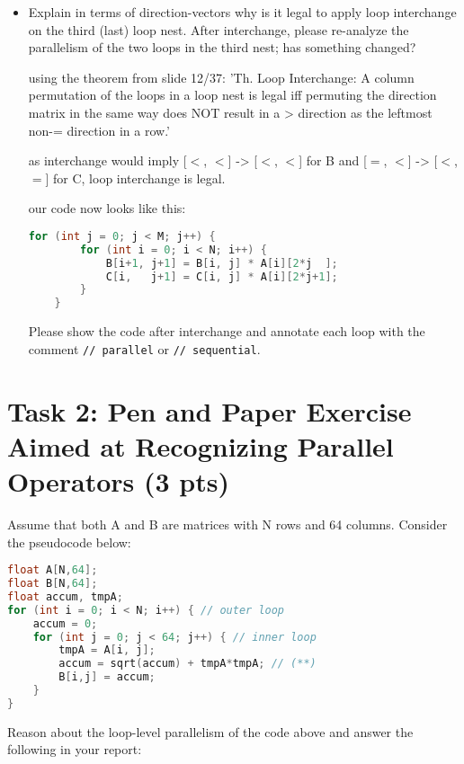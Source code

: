 \documentclass{article}
\begin{document}
\begin{itemize}
\begin{lstlisting}[language=c]
    }
    \end{lstlisting}
    

    \item Explain in terms of direction-vectors why is it legal to apply loop
   interchange on the third (last) loop nest. After interchange, please
   re-analyze the parallelism of the two loops in the third nest; has
   something changed?

    using the theorem from slide 12/37:
    'Th. Loop Interchange: A column permutation of the loops in a loop
    nest is legal iff permuting the direction matrix in the same way does
    NOT result in a > direction as the leftmost non-= direction in a row.'

    as interchange would imply [$<$, $<$] -> [$<$, $<$] for B 
    and [$=$, $<$] -> [$<$, $=$] for C, loop interchange is legal.

    our code now looks like this:

    \begin{lstlisting}[language=c]
    for (int j = 0; j < M; j++) {
        for (int i = 0; i < N; i++) {
            B[i+1, j+1] = B[i, j] * A[i][2*j  ];
            C[i,   j+1] = C[i, j] * A[i][2*j+1];
        }
    }
    \end{lstlisting}

    Please show the code after interchange and annotate each loop
    with the comment \texttt{// parallel} or \texttt{// sequential}.
\end{itemize}

\section{Task 2: Pen and Paper Exercise Aimed at Recognizing Parallel Operators (3 pts)}

Assume that both A and B are matrices with N rows and 64 columns. Consider the pseudocode below:

\begin{lstlisting}[language=C]
float A[N,64];
float B[N,64];
float accum, tmpA;
for (int i = 0; i < N; i++) { // outer loop
    accum = 0;
    for (int j = 0; j < 64; j++) { // inner loop
        tmpA = A[i, j];
        accum = sqrt(accum) + tmpA*tmpA; // (**)
        B[i,j] = accum;
    }
}
\end{lstlisting}

Reason about the loop-level parallelism of the code above and answer the following in your report:
\end{document}
